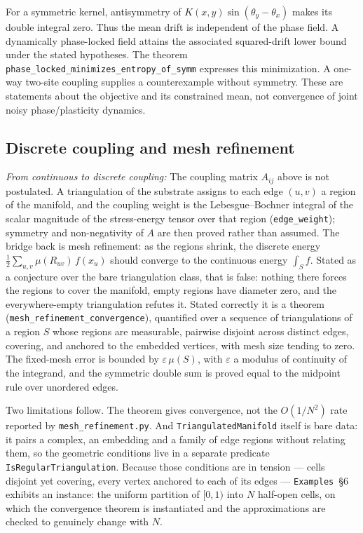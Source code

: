 \documentclass{article}
\begin{document}
For a symmetric kernel, antisymmetry of $K(x,y)\sin(\theta_y-\theta_x)$ makes its double integral zero. Thus the mean drift is independent of the phase field. A dynamically phase-locked field attains the associated squared-drift lower bound under the stated hypotheses. The theorem \nolinkurl{phase_locked_minimizes_entropy_of_symm} expresses this minimization. A one-way two-site coupling supplies a counterexample without symmetry. These are statements about the objective and its constrained mean, not convergence of joint noisy phase/plasticity dynamics.

\subsection{Discrete coupling and mesh refinement}

\textit{From continuous to discrete coupling:} The coupling matrix $A_{ij}$ above is not postulated. A triangulation of the substrate assigns to each edge $(u,v)$ a region of the manifold, and the coupling weight is the Lebesgue--Bochner integral of the scalar magnitude of the stress-energy tensor over that region (\nolinkurl{edge_weight}); symmetry and non-negativity of $A$ are then proved rather than assumed. The bridge back is mesh refinement: as the regions shrink, the discrete energy $\tfrac12\sum_{u,v} \mu(R_{uv})\,f(x_u)$ should converge to the continuous energy $\int_S f$. Stated as a conjecture over the bare triangulation class, that is false: nothing there forces the regions to cover the manifold, empty regions have diameter zero, and the everywhere-empty triangulation refutes it. Stated correctly it is a theorem (\nolinkurl{mesh_refinement_convergence}), quantified over a sequence of triangulations of a region $S$ whose regions are measurable, pairwise disjoint across distinct edges, covering, and anchored to the embedded vertices, with mesh size tending to zero. The fixed-mesh error is bounded by $\varepsilon\,\mu(S)$, with $\varepsilon$ a modulus of continuity of the integrand, and the symmetric double sum is proved equal to the midpoint rule over unordered edges.

Two limitations follow. The theorem gives convergence, not the $O(1/N^2)$ rate reported by \nolinkurl{mesh_refinement.py}. And \texttt{TriangulatedManifold} itself is bare data: it pairs a complex, an embedding and a family of edge regions without relating them, so the geometric conditions live in a separate predicate \texttt{IsRegularTriangulation}. Because those conditions are in tension --- cells disjoint yet covering, every vertex anchored to each of its edges --- \texttt{Examples}~\S6 exhibits an instance: the uniform partition of $[0,1)$ into $N$ half-open cells, on which the convergence theorem is instantiated and the approximations are checked to genuinely change with $N$.
\end{document}
